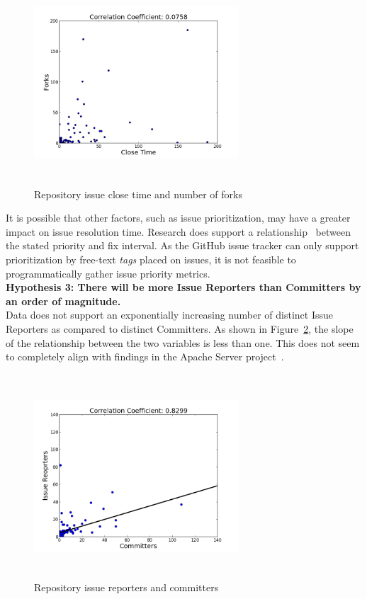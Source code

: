 \documentclass{proc}
\begin{document}
{{{{{{\begin{figure}
\includegraphics[height=3in,width=3in]{images/issue_close_time_forks_scatterplot.png}
\caption{Repository issue close time and number of forks}
\label{fig:issue_close_time_forks_scatterplot}
\end{figure}

It is possible that other factors, such as issue prioritization, may have a greater impact on issue resolution time. Research does support a relationship~\cite{mockus2002two} between the stated priority and fix interval. As the GitHub issue tracker can only support prioritization by free-text \textit{tags} placed on issues, it is not feasible to programmatically gather issue priority metrics.\\

\noindent \textbf{Hypothesis 3: There will be more Issue Reporters than Committers by an order of magnitude.}\\
Data does not support an exponentially increasing number of distinct Issue Reporters as compared to distinct Committers. 
As shown in Figure~\ref{fig:issue_reporters_committers_scatterplot}, the slope of the relationship between the two variables is less than one. This does not seem to completely align with findings in the Apache Server project~\cite{mockus2000case}. 

\begin{figure}
\includegraphics[height=3in,width=3in]{images/issue_reporters_committers_scatterplot.png}
\caption{Repository issue reporters and committers}
\label{fig:issue_reporters_committers_scatterplot}
\end{figure}

}}}}}}
\end{document}
